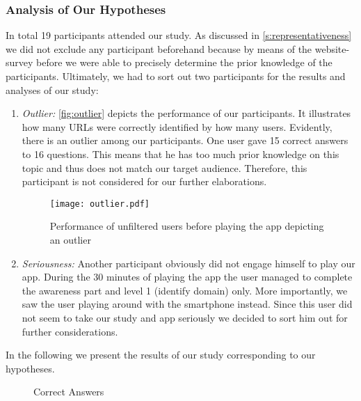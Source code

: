 \subsubsection{Analysis of Our Hypotheses}
\label{s:hypanalysis}
In total 19 participants attended our study.
As discussed in \autoref{s:representativeness} we did not exclude any participant beforehand because by means of the website-survey before we were able to precisely determine the prior knowledge of the participants.
Ultimately, we had to sort out two participants for the results and analyses of our study:

\begin{enumerate}
	\item\textit{Outlier:} \autoref{fig:outlier} depicts the performance of our participants.
	It illustrates how many URLs were correctly identified by how many users.
	Evidently, there is an outlier among our participants. 
	One user gave 15 correct answers to 16 questions.
	This means that he has too much prior knowledge on this topic and thus does not match our target audience.
	Therefore, this participant is not considered for our further elaborations.

\begin{figure}
\centering
\texttt{[image: outlier.pdf]}
\caption{Performance of unfiltered users before playing the app depicting an outlier}
\label{fig:outlier}
\end{figure}

	\item\textit{Seriousness:} Another participant obviously did not engage himself to play our app.
	During the 30 minutes of playing the app the user managed to complete the awareness part and level 1 (identify domain) only.
	More importantly, we saw the user playing around with the smartphone instead.
	Since this user did not seem to take our study and app seriously we decided to sort him out for further considerations.
\end{enumerate}
In the following we present the results of our study corresponding to our hypotheses.

\begin{figure}
\centering
{}
\caption{Correct Answers}
\label{fig:hyp1results}
\end{figure}

